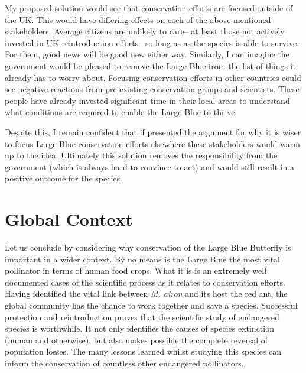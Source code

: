 \documentclass[12pt, twocolumn, letterpaper]{article}
\begin{document}
My proposed solution would see that conservation efforts are focused outside of the UK. This would have differing effects on each of the above-mentioned stakeholders. Average citizens are unlikely to care-- at least those not actively invested in UK reintroduction efforts-- so long as as the species is able to survive. For them, good news will be good new either way. Similarly, I can imagine the government would be pleased to remove the Large Blue from the list of things it already has to worry about. Focusing conservation efforts in other countries could see negative reactions from pre-existing conservation groups and scientists. These people have already invested significant time in their local areas to understand what conditions are required to enable the Large Blue to thrive. 

Despite this, I remain confident that if presented the argument for why it is wiser to focus Large Blue conservation efforts elsewhere these stakeholders would warm up to the idea. Ultimately this solution removes the responsibility from the government (which is always hard to convince to act) and would still result in a positive outcome for the species. 

\section*{Global Context} 
Let us conclude by considering why conservation of the Large Blue Butterfly is important in a wider context. By no means is the Large Blue the most vital pollinator in terms of human food crops. What it is is an extremely well documented cases of the scientific process as it relates to conservation efforts. Having identified the vital link between \textit{M. airon} and its host the red ant, the global community has the chance to work together and save a species. Successful protection and reintroduction proves that the scientific study of endangered species is worthwhile. It not only identifies the causes of species extinction (human and otherwise), but also makes possible the complete reversal of population losses. The many lessons learned whilst studying this species can inform the conservation of countless other endangered pollinators. 
	


\end{document}
